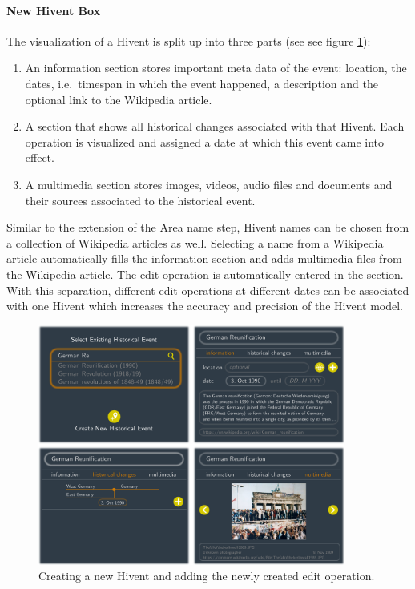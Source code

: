 \paragraph{New Hivent Box} %
\label{par:new_hivent_box}

The visualization of a Hivent is split up into three parts (see see figure \ref{fig:uncertainty_new_hivent_box}):

\begin{enumerate}
  \item An information section stores important meta data of the event: location, the dates, i.e.\ timespan in which the event happened, a description and the optional link to the Wikipedia article.
  \item A section that shows all historical changes associated with that Hivent. Each operation is visualized and assigned a date at which this event came into effect.
  \item A multimedia section stores images, videos, audio files and documents and their sources associated to the historical event.
\end{enumerate}

Similar to the extension of the Area name step, Hivent names can be chosen from a collection of Wikipedia articles as well. Selecting a name from a Wikipedia article automatically fills the information section and adds multimedia files from the Wikipedia article. The edit operation is automatically entered in the section. With this separation, different edit operations at different dates can be associated with one Hivent which increases the accuracy and precision of the Hivent model.

\begin{figure}[ht]
  \centering
  \includegraphics[width = 0.9\textwidth]{graphics/extensions/new_hivent_box}
  \caption{Creating a new Hivent and adding the newly created edit operation.}
  \label{fig:uncertainty_new_hivent_box}
  \vspace{3.0em}
\end{figure}

